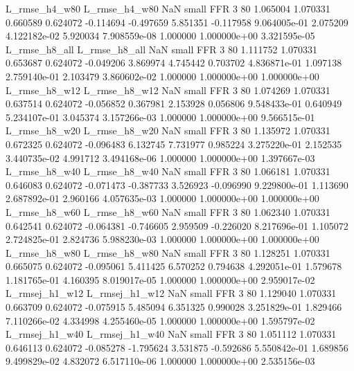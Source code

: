  L_rmse_h4_w80  L_rmse_h4_w80                   NaN      small      FFR                 3 80 1.065004       1.070331 0.660589       0.624072   -0.114694     -0.497659      5.851351    -0.117958   9.064005e-01  2.075209 4.122182e-02     5.920034   7.908559e-08            1.000000    1.000000e+00        3.321595e-05
 L_rmse_h8_all  L_rmse_h8_all                   NaN      small      FFR                 3 80 1.111752       1.070331 0.653687       0.624072   -0.049206      3.869974      4.745442     0.703702   4.836871e-01  1.097138 2.759140e-01     2.103479   3.860602e-02            1.000000    1.000000e+00        1.000000e+00
 L_rmse_h8_w12  L_rmse_h8_w12                   NaN      small      FFR                 3 80 1.074269       1.070331 0.637514       0.624072   -0.056852      0.367981      2.153928     0.056806   9.548433e-01  0.640949 5.234107e-01     3.045374   3.157266e-03            1.000000    1.000000e+00        9.566515e-01
 L_rmse_h8_w20  L_rmse_h8_w20                   NaN      small      FFR                 3 80 1.135972       1.070331 0.672325       0.624072   -0.096483      6.132745      7.731977     0.985224   3.275220e-01  2.152535 3.440735e-02     4.991712   3.494168e-06            1.000000    1.000000e+00        1.397667e-03
 L_rmse_h8_w40  L_rmse_h8_w40                   NaN      small      FFR                 3 80 1.066181       1.070331 0.646083       0.624072   -0.071473     -0.387733      3.526923    -0.096990   9.229800e-01  1.113690 2.687892e-01     2.960166   4.057635e-03            1.000000    1.000000e+00        1.000000e+00
 L_rmse_h8_w60  L_rmse_h8_w60                   NaN      small      FFR                 3 80 1.062340       1.070331 0.642541       0.624072   -0.064381     -0.746605      2.959509    -0.226020   8.217696e-01  1.105072 2.724825e-01     2.824736   5.988230e-03            1.000000    1.000000e+00        1.000000e+00
 L_rmse_h8_w80  L_rmse_h8_w80                   NaN      small      FFR                 3 80 1.128251       1.070331 0.665075       0.624072   -0.095061      5.411425      6.570252     0.794638   4.292051e-01  1.579678 1.181765e-01     4.160395   8.019017e-05            1.000000    1.000000e+00        2.959017e-02
L_rmsej_h1_w12 L_rmsej_h1_w12                   NaN      small      FFR                 3 80 1.129040       1.070331 0.663709       0.624072   -0.075915      5.485094      6.351325     0.990028   3.251829e-01  1.829466 7.110266e-02     4.334998   4.255460e-05            1.000000    1.000000e+00        1.595797e-02
L_rmsej_h1_w40 L_rmsej_h1_w40                   NaN      small      FFR                 3 80 1.051112       1.070331 0.646113       0.624072   -0.085278     -1.795624      3.531875    -0.592686   5.550842e-01  1.689856 9.499829e-02     4.832072   6.517110e-06            1.000000    1.000000e+00        2.535156e-03
